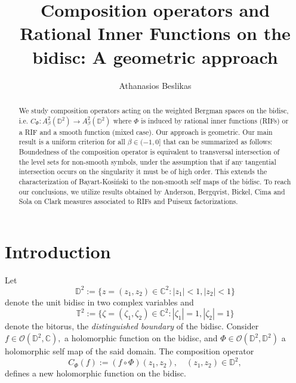 \documentclass[12pt]{amsart}
\numberwithin{equation}{section}
\begin{document}
\author[Beslikas]{Athanasios Beslikas}
\address{Doctoral School of Exact and Natural Studies,
Institute of Mathematics,
Faculty of Mathematics and Computer Science,
Jagiellonian University,
\L{}ojasiewicza 6, PL30348, Cracow, Poland}


\title{Composition operators and Rational Inner Functions on the bidisc: A geometric approach}

\begin{abstract} We study composition operators acting on 
the weighted Bergman spaces on the bidisc, i.e.
$C_{\Phi}:A^2_{\beta}(\mathbb{D}^2)\to A^2_{\beta}(\mathbb{D}^2)$ where $\Phi$ is induced by rational inner functions (RIFs) or a RIF and a smooth function (mixed case). Our approach is geometric. Our main result is a uniform criterion for all $\beta\in(-1,0]$ that can be summarized as follows:
Boundedness of the composition operator is equivalent to transversal intersection of the level sets for non-smooth symbols, under the assumption that if any tangential intersection occurs on the singularity it must be of high order.
This extends the characterization of Bayart-Kosi\'nski to the non-smooth self maps of the bidisc. To reach our conclusions, we utilize results obtained by Anderson, Bergqvist, Bickel, Cima and Sola on Clark measures associated to RIFs and Puiseux factorizations. 
\end{abstract}

\maketitle
\section{Introduction} Let $$\mathbb{D}^2:=\bigg\{z=(z_1,z_2)\in\mathbb{C}^2:|z_1|<1,|z_2|<1\bigg\}$$ denote the unit bidisc in two complex variables and $$\mathbb{T}^2:=\bigg\{\zeta=(\zeta_1,\zeta_2)\in\mathbb{C}^2:|\zeta_1|=1,|\zeta_2|=1\bigg\}$$ denote the bitorus, the \textit{distinguished boundary} of the bidisc. 
Consider $f\in \mathcal{O}(\mathbb{D}^2,\mathbb{C}),$ a holomorphic function on the bidisc,  and $\Phi\in\mathcal{O}(\mathbb{D}^2,\mathbb{D}^2)$ a holomorphic self map of the said domain. The composition operator
$$C_{\Phi}(f):=(f\circ\Phi)(z_1,z_2),\quad (z_1,z_2)\in\mathbb{D}^2,$$
defines a new holomorphic function on the bidisc.
\end{document}
